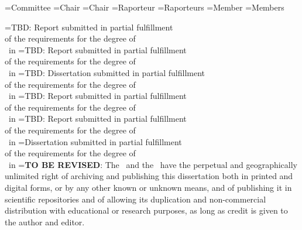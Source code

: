 \UNL@committeetitlestr[en]={Committee}
\UNL@chairstr[1,en]={Chair}
\UNL@chairstr[2,en]={Chair}
\UNL@raporteurstr[1,en]={Raporteur}
\UNL@raporteurstr[2,en]={Raporteurs}
\UNL@memberstr[1,en]={Member}
\UNL@memberstr[2,en]={Members}
	
\UNL@dissertationstr[bsc,en]={TBD: Report submitted in partial fulfillment \\of the requirements for the degree of \\\UNL@degree\ in \majorfield[\UNL@cover@lang]}
\UNL@dissertationstr[prepmsc,en]={TBD: Report submitted in partial fulfillment \\of the requirements for the degree of \\\UNL@degree\ in \majorfield[\UNL@cover@lang]}
\UNL@dissertationstr[msc,en]={TBD: Dissertation submitted in partial fulfillment \\of the requirements for the degree of \\\UNL@degree\ in \majorfield[\UNL@cover@lang]}
\UNL@dissertationstr[propphd,en]={TBD: Report submitted in partial fulfillment \\of the requirements for the degree of \\\UNL@degree\ in \majorfield[\UNL@cover@lang]}
\UNL@dissertationstr[phdplan,en]={TBD: Report submitted in partial fulfillment \\of the requirements for the degree of \\\UNL@degree\ in \majorfield[\UNL@cover@lang]}
\UNL@dissertationstr[phd,en]={Dissertation submitted in partial fulfillment \\of the requirements for the degree of \\\UNL@degree\ in \majorfield[\UNL@cover@lang]}
\UNL@copyrighttext[en]={\textbf{TO BE REVISED}: The \faculty[\UNL@cover@lang]\ and the \university[\UNL@cover@lang]\ have the perpetual and geographically unlimited right of archiving and publishing this dissertation both in printed and digital forms, or by any other known or unknown means, and of publishing it in scientific repositories and of allowing its duplication and non-commercial distribution with educational or research purposes, as long as credit is given to the author and editor.}
